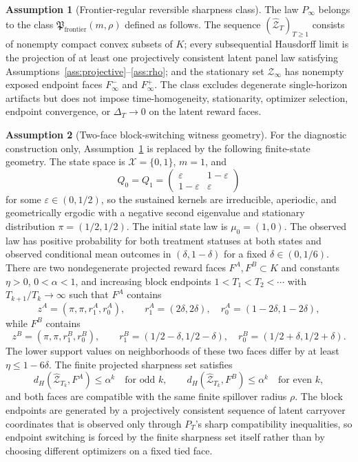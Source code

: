 \documentclass[11pt]{article}
\theoremstyle{definition}
\newtheorem{assumption}{Assumption}
\theoremstyle{plain}
\theoremstyle{remark}
\begin{document}
\begin{assumption}[Frontier-regular reversible sharpness class]\label{ass:face}
The law \(P_{\infty}\) belongs to the class \(\mathfrak P_{\mathrm{frontier}}(m,\rho)\) defined as follows.  The sequence \((\widehat{\mathcal Z}_T)_{T\ge1}\) consists of nonempty compact convex subsets of \(K\); every subsequential Hausdorff limit is the projection of at least one projectively consistent latent panel law satisfying Assumptions~\ref{ass:projective}--\ref{ass:rho}; and the stationary set \(\mathcal Z_\infty\) has nonempty exposed endpoint faces \(F_\infty^-\) and \(F_\infty^+\).  The class excludes degenerate single-horizon artifacts but does not impose time-homogeneity, stationarity, optimizer selection, endpoint convergence, or \(\Delta_T\to0\) on the latent reward faces.
\end{assumption}

\begin{assumption}[Two-face block-switching witness geometry]\label{ass:cycling}
For the diagnostic construction only, Assumption~\ref{ass:face} is replaced by the following finite-state geometry.  The state space is \(\mathcal X=\{0,1\}\), \(m=1\), and
\[
Q_0=Q_1=\begin{pmatrix}\varepsilon&1-\varepsilon\\ 1-\varepsilon&\varepsilon\end{pmatrix}
\]
for some \(\varepsilon\in(0,1/2)\), so the sustained kernels are irreducible, aperiodic, and geometrically ergodic with a negative second eigenvalue and stationary distribution \(\pi=(1/2,1/2)\).  The initial state law is \(\mu_0=(1,0)\).  The observed law has positive probability for both treatment statuses at both states and observed conditional mean outcomes in \((\delta,1-\delta)\) for a fixed \(\delta\in(0,1/6)\).  There are two nondegenerate projected reward faces \(F^A,F^B\subset K\) and constants \(\eta>0\), \(0<\alpha<1\), and increasing block endpoints \(1<T_1<T_2<\cdots\) with \(T_{k+1}/T_k\to\infty\) such that \(F^A\) contains
\[
z^A=(\pi,\pi,r_1^A,r_0^A),\qquad
r_1^A=(2\delta,2\delta),\quad r_0^A=(1-2\delta,1-2\delta),
\]
while \(F^B\) contains
\[
z^B=(\pi,\pi,r_1^B,r_0^B),\qquad
r_1^B=(1/2-\delta,1/2-\delta),\quad
r_0^B=(1/2+\delta,1/2+\delta).
\]
The lower support values on neighborhoods of these two faces differ by at least \(\eta\le 1-6\delta\).  The finite projected sharpness set satisfies
\[
d_H(\widehat{\mathcal Z}_{T_k},F^A)\le \alpha^{k}\quad\text{for odd }k,\qquad
d_H(\widehat{\mathcal Z}_{T_k},F^B)\le \alpha^{k}\quad\text{for even }k,
\]
and both faces are compatible with the same finite spillover radius \(\rho\).  The block endpoints are generated by a projectively consistent sequence of latent carryover coordinates that is observed only through \(P_T\)'s sharp compatibility inequalities, so endpoint switching is forced by the finite sharpness set itself rather than by choosing different optimizers on a fixed tied face.
\end{assumption}
\end{document}
